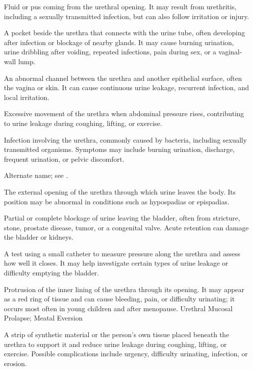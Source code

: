  Fluid or pus coming from the urethral opening. It may result from urethritis, including a sexually transmitted infection, but can also follow irritation or injury.

 A pocket beside the urethra that connects with the urine tube, often developing after infection or blockage of nearby glands. It may cause burning urination, urine dribbling after voiding, repeated infections, pain during sex, or a vaginal-wall lump.

 An abnormal channel between the urethra and another epithelial surface, often the vagina or skin. It can cause continuous urine leakage, recurrent infection, and local irritation.

 Excessive movement of the urethra when abdominal pressure rises, contributing to urine leakage during coughing, lifting, or exercise.

 Infection involving the urethra, commonly caused by bacteria, including sexually transmitted organisms. Symptoms may include burning urination, discharge, frequent urination, or pelvic discomfort.

 Alternate name; see .

 The external opening of the urethra through which urine leaves the body. Its position may be abnormal in conditions such as hypospadias or epispadias.

 Partial or complete blockage of urine leaving the bladder, often from stricture, stone, prostate disease, tumor, or a congenital valve. Acute retention can damage the bladder or kidneys.

 A test using a small catheter to measure pressure along the urethra and assess how well it closes. It may help investigate certain types of urine leakage or difficulty emptying the bladder.

 Protrusion of the inner lining of the urethra through its opening. It may appear as a red ring of tissue and can cause bleeding, pain, or difficulty urinating; it occurs most often in young children and after menopause.
\synonyms
Urethral Mucosal Prolapse; Meatal Eversion

 A strip of synthetic material or the person’s own tissue placed beneath the urethra to support it and reduce urine leakage during coughing, lifting, or exercise. Possible complications include urgency, difficulty urinating, infection, or erosion.

